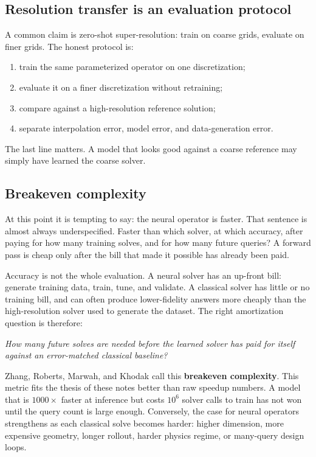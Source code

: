 \documentclass[10pt,a4paper]{article}
\begin{document}
\subsection{Resolution transfer is an evaluation protocol}

A common claim is zero-shot super-resolution: train on coarse grids, evaluate
on finer grids. The honest protocol is:
\begin{enumerate}
\item train the same parameterized operator on one discretization;
\item evaluate it on a finer discretization without retraining;
\item compare against a high-resolution reference solution;
\item separate interpolation error, model error, and data-generation error.
\end{enumerate}
The last line matters. A model that looks good against a coarse reference may
simply have learned the coarse solver.

\subsection{Breakeven complexity}
\label{sec:breakeven}

At this point it is tempting to say: the neural operator is faster. That
sentence is almost always underspecified. Faster than which solver, at which
accuracy, after paying for how many training solves, and for how many future
queries? A forward pass is cheap only after the bill that made it possible
has already been paid.

Accuracy is not the whole evaluation. A neural solver has an up-front bill:
generate training data, train, tune, and validate. A classical solver has
little or no training bill, and can often produce lower-fidelity answers more
cheaply than the high-resolution solver used to generate the dataset. The
right amortization question is therefore:
\begin{center}
\emph{How many future solves are needed before the learned solver has paid for
itself against an error-matched classical baseline?}
\end{center}
Zhang, Roberts, Marwah, and Khodak call this \textbf{breakeven complexity}.
This metric fits the thesis of these notes better than raw speedup numbers.
A model that is $1000\times$ faster at inference but costs $10^6$ solver calls
to train has not won until the query count is large enough. Conversely, the
case for neural operators strengthens as each classical solve becomes harder:
higher dimension, more expensive geometry, longer rollout, harder physics
regime, or many-query design loops.
\end{document}
